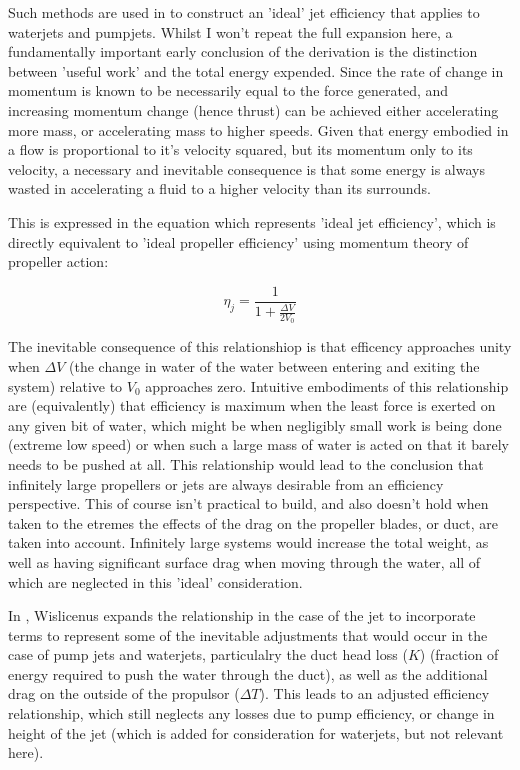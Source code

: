 \documentclass{article}\usepackage[]{graphicx}\usepackage[]{color}
\begin{document}
Such methods are used in \cite[8-14]{wislicenus1973} to construct an 'ideal' jet efficiency that applies to waterjets and pumpjets. Whilst I won't repeat the full expansion here, a fundamentally important early conclusion of the derivation is the distinction between 'useful work' and the total energy expended. Since the rate of change in momentum is known to be necessarily equal to the force generated, and increasing momentum change (hence thrust) can be achieved either accelerating more mass, or accelerating mass to higher speeds.   Given that energy embodied in a flow is proportional to it's velocity squared, but its momentum only to its velocity, a necessary and inevitable consequence is that some energy is always wasted in accelerating a fluid to a higher velocity than its surrounds.

This is expressed in the equation which represents 'ideal jet efficiency', which is directly equivalent to 'ideal propeller efficiency' using momentum theory of propeller action:

\begin{equation}
\label{eq:3}
\eta_j = \frac{1}{1+\frac{\Delta V}{2V_0}}
\end{equation}

The inevitable consequence of this relationshiop is that efficency approaches unity when $\Delta V$ (the change in water of the water between entering and exiting the system) relative to $V_0$ approaches zero.  Intuitive embodiments of this relationship are (equivalently) that efficiency is maximum when the least force is exerted on any given bit of water, which might be when negligibly small work is being done (extreme low speed) or when such a large mass of water is acted on that it barely needs to be pushed at all.  This relationship would lead to the conclusion that infinitely large propellers or jets are always desirable from an efficiency perspective.  This of course isn't practical to build, and also doesn't hold when taken to the etremes the effects of the drag on the propeller blades, or duct, are taken into account.  Infinitely large systems would increase the total weight, as well as having significant surface drag when moving through the water, all of which are neglected in this 'ideal' consideration.

In \cite[8-14]{wislicenus1973}, Wislicenus expands the relationship in the case of the jet to incorporate terms to represent some of the inevitable adjustments that would occur in the case of pump jets and waterjets, particulalry the duct head loss ($K$) (fraction of energy required to push the water through the duct), as well as the additional drag on the outside of the propulsor ($\Delta T$).  This leads to an adjusted efficiency relationship, which still neglects any losses due to pump efficiency, or change in height of the jet (which is added for consideration for waterjets, but not relevant here).
\end{document}
